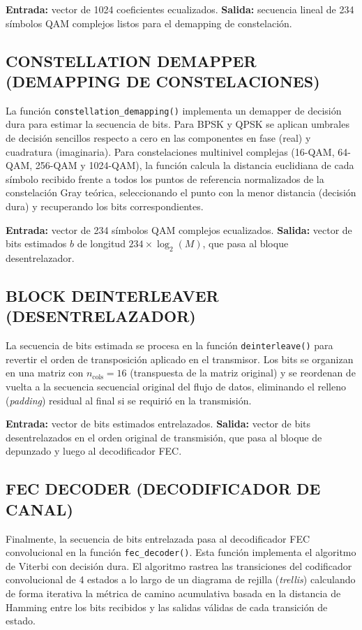 \textbf{Entrada:} vector de 1024 coeficientes ecualizados. \textbf{Salida:} secuencia lineal de 234 símbolos QAM complejos listos para el demapping de constelación.

\subsection{CONSTELLATION DEMAPPER (DEMAPPING DE CONSTELACIONES)}
La función \texttt{constellation\_demapping()} implementa un demapper de decisión dura para estimar la secuencia de bits. Para BPSK y QPSK se aplican umbrales de decisión sencillos respecto a cero en las componentes en fase (real) y cuadratura (imaginaria). Para constelaciones multinivel complejas (16-QAM, 64-QAM, 256-QAM y 1024-QAM), la función calcula la distancia euclidiana de cada símbolo recibido frente a todos los puntos de referencia normalizados de la constelación Gray teórica, seleccionando el punto con la menor distancia (decisión dura) y recuperando los bits correspondientes.

\textbf{Entrada:} vector de 234 símbolos QAM complejos ecualizados. \textbf{Salida:} vector de bits estimados $\hat{b}$ de longitud $234 \times \log_2(M)$, que pasa al bloque desentrelazador.

\subsection{BLOCK DEINTERLEAVER (DESENTRELAZADOR)}
La secuencia de bits estimada se procesa en la función \texttt{deinterleave()} para revertir el orden de transposición aplicado en el transmisor. Los bits se organizan en una matriz con $n_{\text{cols}} = 16$ (transpuesta de la matriz original) y se reordenan de vuelta a la secuencia secuencial original del flujo de datos, eliminando el relleno (\textit{padding}) residual al final si se requirió en la transmisión.

\textbf{Entrada:} vector de bits estimados entrelazados. \textbf{Salida:} vector de bits desentrelazados en el orden original de transmisión, que pasa al bloque de depunzado y luego al decodificador FEC.

\subsection{FEC DECODER (DECODIFICADOR DE CANAL)}
Finalmente, la secuencia de bits entrelazada pasa al decodificador FEC convolucional en la función \texttt{fec\_decoder()}. Esta función implementa el algoritmo de Viterbi con decisión dura. El algoritmo rastrea las transiciones del codificador convolucional de 4 estados a lo largo de un diagrama de rejilla (\textit{trellis}) calculando de forma iterativa la métrica de camino acumulativa basada en la distancia de Hamming entre los bits recibidos y las salidas válidas de cada transición de estado.

